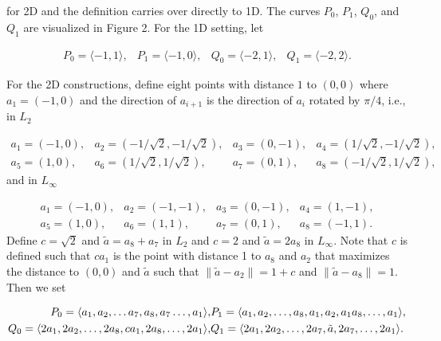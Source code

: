 \documentclass[10pt,a4paper]{article}
\begin{document}
for 2D and the definition carries over directly to 1D. The curves $P_{0}$, $P_{1}$, $Q_{0}$, and $Q_{1}$ are visualized in Figure 2. For the 1D setting, let
\par
\[\begin{aligned}
\displaystyle P_{0}=\langle-1,1\rangle, & \displaystyle P_{1}=\langle-1,0\rangle, & \displaystyle Q_{0}=\langle-2,1\rangle, & \displaystyle Q_{1}=\langle-2,2\rangle.
\end{aligned}\]
\par
For the 2D constructions, define eight points with distance $1$ to $(0,0)$ where $a_{1}=(-1,0)$ and the direction of $a_{i+1}$ is the direction of $a_{i}$ rotated by $\pi/4$, i.e., in $L_{2}$
\par
\[\begin{aligned}
\displaystyle a_{1}=(-1,0), & \displaystyle a_{2}=(-1/\sqrt{2},-1/\sqrt{2}), & \displaystyle a_{3}=(0,-1), & \displaystyle a_{4}=(1/\sqrt{2},-1/\sqrt{2}), \\
\displaystyle a_{5}=(1,0), & \displaystyle a_{6}=(1/\sqrt{2},1/\sqrt{2}), & \displaystyle a_{7}=(0,1), & \displaystyle a_{8}=(-1/\sqrt{2},1/\sqrt{2}),
\end{aligned}\]
and in $L_{\infty}$
\par
\[\begin{aligned}
\displaystyle a_{1}=(-1,0), & \displaystyle a_{2}=(-1,-1), & \displaystyle a_{3}=(0,-1), & \displaystyle a_{4}=(1,-1), \\
\displaystyle a_{5}=(1,0), & \displaystyle a_{6}=(1,1), & \displaystyle a_{7}=(0,1), & \displaystyle a_{8}=(-1,1).
\end{aligned}\]
Define $c=\sqrt{2}$ and $\tilde{a}=a_{8}+a_{7}$ in $L_{2}$ and $c=2$ and $\tilde{a}=2a_{8}$ in $L_{\infty}$. Note that $c$ is defined such that $ca_{1}$ is the point with distance 1 to $a_{8}$ and $a_{2}$ that maximizes the distance to $(0,0)$ and $\tilde{a}$ such that $\|\tilde{a}-a_{2}\|=1+c$ and $\|\tilde{a}-a_{8}\|=1$. Then we set
\par
\[\begin{aligned}
\displaystyle P_{0}=\langle a_{1},a_{2},\dots a_{7},a_{8},a_{7}\dots,a_{1}\rangle, & \displaystyle P_{1}=\langle a_{1},a_{2},\dots,a_{8},a_{1},a_{2},a_{1}a_{8},%
\dots,a_{1}\rangle, \\
\displaystyle Q_{0}=\langle 2a_{1},2a_{2},\dots,2a_{8},ca_{1},2a_{8},\dots,2a_%
{1}\rangle, & \displaystyle Q_{1}=\langle 2a_{1},2a_{2},\dots,2a_{7},\tilde{a},2a_{7},\dots,%
2a_{1}\rangle.
\end{aligned}\]
\end{document}
